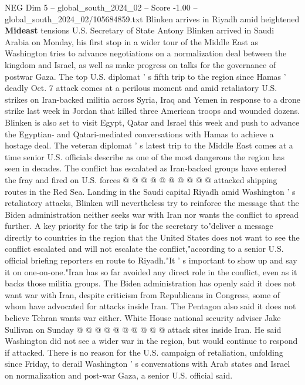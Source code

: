 \begin{textsample}{NEG Dim 5 – global\_south\_2024\_02 – Score -1.00 – global\_south\_2024\_02/105684859.txt}  \label{ex:f5_neg_302}
Blinken arrives in Riyadh amid heightened \textbf{Mideast} tensions U.S.
Secretary of State Antony Blinken arrived in Saudi Arabia on Monday, his first stop in a wider tour of the Middle East as Washington tries to advance negotiations on a normalization deal between the kingdom and Israel, as well as make progress on talks for the governance of postwar Gaza.
The top U.S. diplomat ' s fifth trip to the region since Hamas ' deadly Oct. 7 attack comes at a perilous moment and amid retaliatory U.S. strikes on Iran-backed militia across Syria, Iraq and Yemen in response to a drone strike last week in Jordan that killed three American troops and wounded dozens.
Blinken is also set to visit Egypt, Qatar and Israel this week and push to advance the Egyptian- and Qatari-mediated conversations with Hamas to achieve a hostage deal.
The veteran diplomat ' s latest trip to the Middle East comes at a time senior U.S. officials describe as one of the most dangerous the region has seen in decades.
The conflict has escalated as Iran-backed groups have entered the fray and fired on U.S. forces @ @ @ @ @ @ @ @ @ @ attacked shipping routes in the Red Sea.
Landing in the Saudi capital Riyadh amid Washington ' s retaliatory attacks, Blinken will nevertheless try to reinforce the message that the Biden administration neither seeks war with Iran nor wants the conflict to spread further.
A key priority for the trip is for the secretary to"deliver a message directly to countries in the region that the United States does not want to see the conflict escalated and will not escalate the conflict,"according to a senior U.S. official briefing reporters en route to Riyadh."It ' s important to show up and say it on one-on-one."Iran has so far avoided any direct role in the conflict, even as it backs those militia groups.
The Biden administration has openly said it does not want war with Iran, despite criticism from Republicans in Congress, some of whom have advocated for attacks inside Iran.
The Pentagon also said it does not believe Tehran wants war either.
White House national security adviser Jake Sullivan on Sunday @ @ @ @ @ @ @ @ @ @ attack sites inside Iran.
He said Washington did not see a wider war in the region, but would continue to respond if attacked.
There is no reason for the U.S. campaign of retaliation, unfolding since Friday, to derail Washington ' s conversations with Arab states and Israel on normalization and post-war Gaza, a senior U.S. official said.

\end{textsample}
